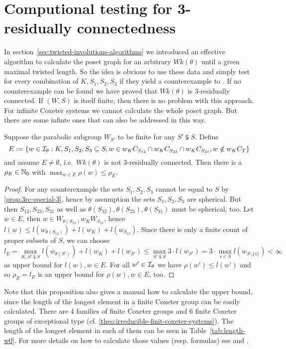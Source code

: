\section{Computional testing for 3-residually connectedness}
\label{sec:3rc-compution-testing}

In section~\ref{sec:twisted-involutions-algorithms} we introduced an effective algorithm to calculate the poset graph for an arbitrary $Wk(\theta)$ until a given maximal twisted length. So the idea is obvious to use these data and simply test for every combination of $K,S_1,S_2,S_3$ if they yield a counterexample to . If no counterexample can be found we have proved that $Wk(\theta)$ is 3-residually connected. If $(W,S)$ is itself finite, then there is no problem with this approach. For infinite Coxeter systems we cannot calculate the whole poset graph. But there are some infinte ones that can also be addressed in this way.

\begin{lemm}
	Suppose the parabolic subgroup $W_{S'}$ to be finite for any $S' \subsetneqq S$. Define
	$$ E := \{ w \in \mathcal{I}_{\theta} : K,S_1,S_2,S_3 \subseteq S, w \in w_K C_{S_{12}} \cap w_K C_{S_{23}} \cap w_K C_{S_{31}}, w \notin w_K C_T \} $$
	and assume $E \neq \emptyset$, i.e.\ $Wk(\theta)$ is not 3-residually connected. Then there is a $\rho_E \in \mathbb{N}_0$ with $\max_{w \in E} \rho(w) \leq \rho_E$.

	\begin{proof}
		For any counterexample the sets $S_1,S_2,S_3$ cannot be equal to $S$ by \ref{prop:3rc-special-3}, hence by assumption the sets $S_1,S_2,S_3$ are spherical. But then $S_{12},S_{23},S_{31}$ as well as $\theta(S_{12}),\theta(S_{23}),\theta(S_{31})$ must be spherical, too. Let $w \in E$, then $w \in W_{\theta(S_{12})} w_K W_{S_{12}}$, hence $l(w) \leq l(w_{\theta(S_{12})}) + l(w_K) + l(w_{S_{12}})$. Since there is only a finite count of proper subsets of $S$, we can choose
		$$ l_E = \max_{K,S' \subsetneqq S} l(w_{\theta(S')}) + l(w_K) + l(w_{S'}) \leq \max_{S' \subsetneqq S} 3 \cdot l(w_{S'}) = 3 \cdot \max_{s \in S} l(w_{S \setminus \{s\}}) < \infty $$
		as upper bound for $l(w), w \in E$. For all $w' \in \mathcal{I}_{\theta}$ we have $\rho(w') \leq l(w')$ and so $\rho_E = l_E$ is an upper bound for $\rho(w), w \in E$, too.
	\end{proof}
\end{lemm}

\begin{rema}
	Note that this proposition also gives a manual how to calculate the upper bound, since the length of the longest element in a finite Coxeter group can be easily calculated. There are 4 families of finite Coxeter groups and 6 finite Coxeter groups of exceptional type (cf. \ref{theo:irreducible-finit-coxeter-systems}). The length of the longest element in each of them can be seen in Table~\ref{tab:length-w0}. For more details on how to calculate those values (resp. formulas) see \cite[Section 1.2]{franzsen:automorphisms} and \cite[Section 2.11]{humphreys:coxeter}.
\end{rema}

